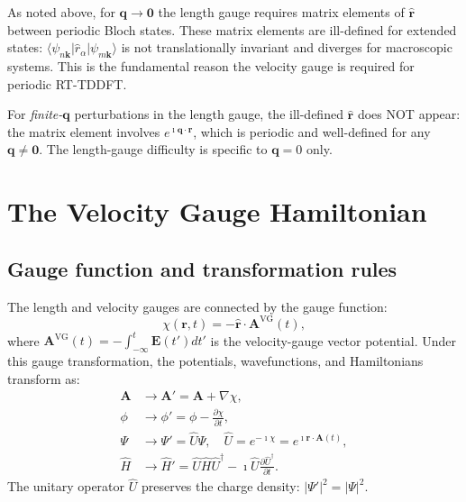 \documentclass[11pt]{article}
\newcommand{\iunit}{\imath}          %
\newcommand{\Avec}{\mathbf{A}}
\begin{document}
As noted above, for $\mathbf{q}\to\mathbf{0}$ the length gauge
requires matrix elements of $\hat{\mathbf{r}}$ between periodic
Bloch states.
These matrix elements are ill-defined for extended states:
$\langle\psi_{n\mathbf{k}}|\hat{r}_\alpha|\psi_{m\mathbf{k}}\rangle$
is not translationally invariant and diverges for macroscopic
systems.
This is the fundamental reason the velocity gauge is required for
periodic RT-TDDFT.

For \emph{finite-$\mathbf{q}$} perturbations in the length gauge,
the ill-defined $\hat{\mathbf{r}}$ does NOT appear: the matrix
element involves $e^{\iunit\mathbf{q}\cdot\mathbf{r}}$, which is
periodic and well-defined for any $\mathbf{q}\neq\mathbf{0}$.
The length-gauge difficulty is specific to $\mathbf{q}=0$ only.

\section{The Velocity Gauge Hamiltonian}

\subsection{Gauge function and transformation rules}

The length and velocity gauges are connected by the gauge function:
\begin{equation}
  \chi(\mathbf{r},t)
  = -\hat{\mathbf{r}}\cdot\Avec^\mathrm{VG}(t),
  \label{eq:chi}
\end{equation}
where $\Avec^\mathrm{VG}(t) = -\int_{-\infty}^t\mathbf{E}(t')dt'$
is the velocity-gauge vector potential.
Under this gauge transformation, the potentials, wavefunctions,
and Hamiltonians transform as:
\begin{align}
  \Avec &\to \Avec' = \Avec + \nabla\chi,
  \label{eq:gt-A}
  \\
  \phi &\to \phi' = \phi - \frac{\partial\chi}{\partial t},
  \label{eq:gt-phi}
  \\
  \Psi &\to \Psi' = \hat{U}\Psi,
  \quad
  \hat{U} = e^{-\iunit\chi} = e^{\iunit\mathbf{r}\cdot\Avec(t)},
  \label{eq:gt-psi}
  \\
  \hat{H} &\to \hat{H}'
  = \hat{U}\hat{H}\hat{U}^\dagger
    - \iunit\hat{U}\frac{\partial\hat{U}^\dagger}{\partial t}.
  \label{eq:gt-H}
\end{align}
The unitary operator $\hat{U}$ preserves the charge density:
$|\Psi'|^2 = |\Psi|^2$.
\end{document}
